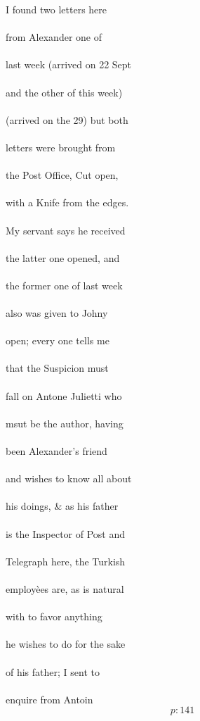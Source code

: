\documentclass{report}
\begin{document}
	\par{
 	I found two letters here\ \\\ \\from Alexander one of\ \\\ \\last week (arrived on 22 Sept\ \\\ \\and the other of this week)\ \\\ \\(arrived on the 29) but both\ \\\ \\letters were brought from\ \\\ \\the Post Office, Cut open,\ \\\ \\with a Knife from the edges.\ \\\ \\My servant says he received\ \\\ \\the latter one opened, and\ \\\ \\the former one of last week\ \\\ \\also was given to Johny\ \\\ \\open; every one tells me\ \\\ \\that the Suspicion must\ \\\ \\fall on Antone Julietti who\ \\\ \\msut be the author, having\ \\\ \\been Alexander’s friend\ \\\ \\and wishes to know all about\ \\\ \\his doings, \& as his father\ \\\ \\is the Inspector of Post and\ \\\ \\Telegraph here, the Turkish\ \\\ \\employèes are, as is natural\ \\\ \\with to favor anything\ \\\ \\he wishes to do for the sake\ \\\ \\of his father; I sent to\ \\\ \\enquire from Antoin\ \\
  \[p: 141 \]

	}
\end{document}
